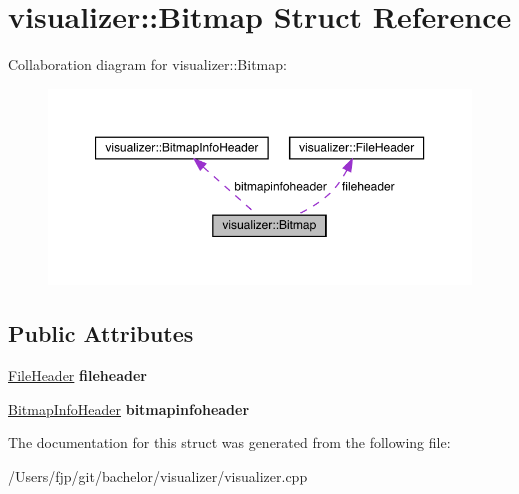 \hypertarget{structvisualizer_1_1_bitmap}{}\section{visualizer\+:\+:Bitmap Struct Reference}
\label{structvisualizer_1_1_bitmap}


Collaboration diagram for visualizer\+:\+:Bitmap\+:
\nopagebreak
\begin{figure}[H]
\begin{center}
\leavevmode
\includegraphics[width=350pt]{structvisualizer_1_1_bitmap__coll__graph}
\end{center}
\end{figure}
\subsection*{Public Attributes}
\begin{DoxyCompactItemize}
\item 
\mbox{\label{structvisualizer_1_1_bitmap_a35cd50ab96ca92a2f3cc92fbec0ccef0}} 
\mbox{\hyperlink{structvisualizer_1_1_file_header}{File\+Header}} {\bfseries fileheader}
\item 
\mbox{\label{structvisualizer_1_1_bitmap_ae321d14404bf8daff08333b6b2858603}} 
\mbox{\hyperlink{structvisualizer_1_1_bitmap_info_header}{Bitmap\+Info\+Header}} {\bfseries bitmapinfoheader}
\end{DoxyCompactItemize}


The documentation for this struct was generated from the following file\+:\begin{DoxyCompactItemize}
\item 
/\+Users/fjp/git/bachelor/visualizer/visualizer.\+cpp\end{DoxyCompactItemize}
